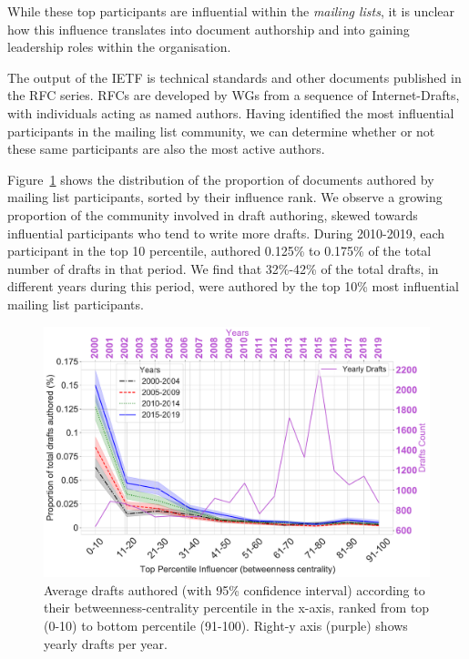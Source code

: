 \documentclass[twocolumn,10pt]{article}
\newlength{\figureWidthOneColumn}
\newcommand{\pb}[1]{\vspace{0.75ex}\noindent{\textbf{#1}}}
\begin{document}

While these top participants are influential within the \emph{mailing
lists}, it is unclear how this influence translates into document
authorship and into gaining  leadership roles within  the organisation.

\pb{Draft authorship}
The output of the IETF is technical standards and other documents published
in the RFC series. RFCs are developed by WGs from a sequence of Internet-Drafts,
with individuals acting as named authors.  Having identified the most
influential participants in the mailing list community, we can determine
whether or not these same participants are also the most active authors.

Figure~\ref{fig:drafts_initiation_top_percentile} shows the distribution of
the proportion of documents authored by mailing list participants, sorted
by their influence rank. We observe a growing proportion of the community
involved in draft authoring, skewed towards influential participants who
tend to write more drafts.  During 2010-2019, each participant in the top
10 percentile, authored 0.125\% to 0.175\% of the total number of drafts in
that period. We find that 32\%-42\% of the total drafts, in different years
during this period, were authored by the top 10\% most influential mailing
list participants.

\begin{figure}
  \centering
  \includegraphics[width=\figureWidthOneColumn]{figures-prev/icwsm-2022/documents_proportion_published_top_percentile.pdf}
  \caption{
    Average drafts authored (with 95\% confidence interval) according to
    their betweenness-centrality percentile in the x-axis, ranked from top
    (0-10) to bottom percentile (91-100).  Right-y axis (purple) shows
    yearly drafts per year.
  }
  \label{fig:drafts_initiation_top_percentile}
\end{figure}
\end{document}
